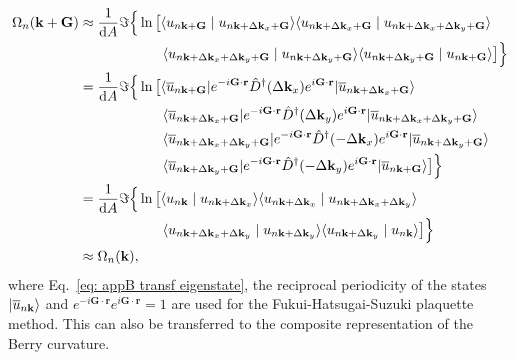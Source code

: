 \begin{align}
    \Omega_n(\mathbf{k}+\mathbf{G}) &\approx 
    \frac{1}{\text{d}A}\Im \Big\{\ln\big[ \langle u_{n\mathbf{k}+\mathbf{G}} \mid u_{n\mathbf{k}+\Delta\mathbf{k}_x + \mathbf{G}} \rangle \langle u_{n\mathbf{k}+\Delta \mathbf{k}_x +  \mathbf{G}} \mid u_{n\mathbf{k}+\Delta\mathbf{k}_x + \Delta \mathbf{k}_y+ \mathbf{G}} \rangle \nonumber\\
    &\qquad\qquad\qquad\langle u_{n\mathbf{k} +\Delta\mathbf{k}_x + \Delta \mathbf{k}_y+ \mathbf{G}} \mid u_{n\mathbf{k}+\Delta\mathbf{k}_y+ \mathbf{G}} \rangle 
    \langle u_{n\mathbf{k} +\Delta\mathbf{k}_y + \mathbf{G}} \mid u_{n\mathbf{k}+ \mathbf{G}} \rangle \big] \Big\}\nonumber\\
    &=\frac{1}{\text{d}A}\Im\Big\{\ln\big[
    \langle \overline{u}_{n\mathbf{k}+\mathbf{G}} \rvert e^{-i\mathbf{G}\cdot\mathbf{r}} \hat{D}^\dagger( \Delta \mathbf{k}_x) e^{i\mathbf{G}\cdot\mathbf{r}}\lvert \overline{u}_{n\mathbf{k}+{\Delta \mathbf{k}_x} + \mathbf{G}} \rangle \nonumber \\
     &\qquad\qquad\qquad
    \langle \overline{u}_{n\mathbf{k}+\Delta \mathbf{k}_x + \mathbf{G}} \rvert e^{-i\mathbf{G}\cdot\mathbf{r}} \hat{D}^\dagger( \Delta \mathbf{k}_y)e^{i\mathbf{G}\cdot\mathbf{r}}\lvert \overline{u}_{n\mathbf{k}+{\Delta \mathbf{k}_x} + \Delta\mathbf{k}_y + \mathbf{G}} \rangle \nonumber\\
     &\qquad\qquad\qquad
    \langle \overline{u}_{n\mathbf{k}+\Delta \mathbf{k}_x + \Delta \mathbf{k}_y + \mathbf{G}} \rvert e^{-i\mathbf{G}\cdot\mathbf{r}}\hat{D}^\dagger(- \Delta \mathbf{k}_x)e^{i\mathbf{G}\cdot\mathbf{r}}\lvert \overline{u}_{n\mathbf{k}+\Delta \mathbf{k}_y + \mathbf{G}} \rangle \nonumber\\
     &\qquad\qquad\qquad
    \langle \overline{u}_{n\mathbf{k}+\Delta \mathbf{k}_y + \mathbf{G}} \rvert e^{-i\mathbf{G}\cdot\mathbf{r}} \hat{D}^\dagger( -\Delta \mathbf{k}_y) e^{i\mathbf{G}\cdot\mathbf{r}}\lvert \overline{u}_{n\mathbf{k} + \mathbf{G}} \rangle\big] \Big\}\nonumber\\
    &= \frac{1}{\text{d}A}\Im\Big\{\ln\big[
    \langle u_{n\mathbf{k}} \mid u_{n\mathbf{k}+{\Delta \mathbf{k}_x}} \rangle 
    \langle u_{n\mathbf{k}+\Delta \mathbf{k}_x} \mid u_{n\mathbf{k}+{\Delta \mathbf{k}_x}+ \Delta \mathbf{k}_y} \rangle \nonumber\\
    &\quad\qquad\qquad\quad
    \langle u_{n\mathbf{k}+\Delta \mathbf{k}_x + \Delta \mathbf{k}_y} \mid u_{n\mathbf{k}+\Delta \mathbf{k}_y} \rangle 
    \langle u_{n\mathbf{k}+\Delta \mathbf{k}_y} \mid u_{n\mathbf{k}} \rangle\big] \Big\} \nonumber \\
    &\approx \Omega_n(\mathbf{k}),
\end{align}
where Eq.~\eqref{eq: appB transf eigenstate}, the reciprocal periodicity of the states $\lvert \overline{u}_{n\mathbf{k}} \rangle$ and $e^{-i\mathbf{G}\cdot\mathbf{r}}e^{i\mathbf{G}\cdot\mathbf{r}} = 1$ are used for the Fukui-Hatsugai-Suzuki plaquette method. This can also be transferred to the composite representation of the Berry curvature.